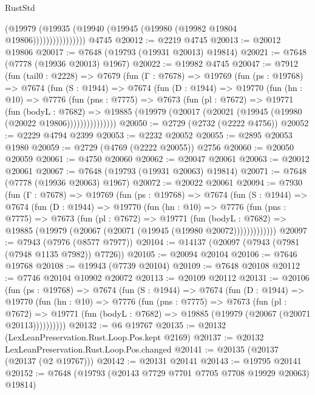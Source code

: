 \begin{lexlean}{RustStd}
\begin{coremodule}
{\begin{coremodule}
{{{{{{{{{{{{{{{{{{{{{{{{{{{{{{{{{{{{{{{{{{{{{{{{{{{{{                        (@19979
                          (@19935 (@19940 (@19945 (@19980 (@19982 @19804 @19806))))))))))))))))
    @4745
@20012 := @2219 @4745
@20013 := @20012 @19806
@20017 := @7648 (@19793 (@19931 @20013) @19814)
@20021 := @7648 (@7778 (@19936 @20013) @1967)
@20022 := @19982 @4745
@20047 := @7912
    (fun (tail0 : @2228) =>
    @7679
      (fun (Γ : @7678) =>
      @19769
        (fun (ps : @19768) =>
        @7674
          (fun (S : @1944) =>
          @7674
            (fun (D : @1944) =>
            @19770
              (fun (hn : @10) =>
              @7776
                (fun (pns : @7775) =>
                @7673
                  (fun (pl : @7672) =>
                  @19771
                    (fun (bodyL : @7682) =>
                    @19885 (@19979 (@20017 (@20021 (@19945 (@19980 (@20022 @19806)))))))))))))))
@20050 := @2729 (@2732 (@2222 @4756))
@20052 := @2229 @4794 @2399
@20053 := @2232 @20052
@20055 := @2895 @20053 @1980
@20059 := @2729 (@4769 (@2222 @20055)) @2756
@20060 := @20050 @20059
@20061 := @4750 @20060
@20062 := @20047 @20061
@20063 := @20012 @20061
@20067 := @7648 (@19793 (@19931 @20063) @19814)
@20071 := @7648 (@7778 (@19936 @20063) @1967)
@20072 := @20022 @20061
@20094 := @7930
    (fun (Γ : @7678) =>
    @19769
      (fun (ps : @19768) =>
      @7674
        (fun (S : @1944) =>
        @7674
          (fun (D : @1944) =>
          @19770
            (fun (hn : @10) =>
            @7776
              (fun (pns : @7775) =>
              @7673
                (fun (pl : @7672) =>
                @19771
                  (fun (bodyL : @7682) =>
                  @19885 (@19979 (@20067 (@20071 (@19945 (@19980 @20072)))))))))))))
@20097 := @7943 (@7976 (@8577 @7977))
@20104 := @14137 (@20097 (@7943 (@7981 (@7948 @1135 @7982)) @7726))
@20105 := @20094 @20104
@20106 := @7646 @19768
@20108 := @19943 (@7739 @20104)
@20109 := @7648 @20108
@20112 := @7746 @20104 @10902 @20072
@20113 := @20109 @20112
@20131 := @20106
    (fun (ps : @19768) =>
    @7674
      (fun (S : @1944) =>
      @7674
        (fun (D : @1944) =>
        @19770
          (fun (hn : @10) =>
          @7776
            (fun (pns : @7775) =>
            @7673
              (fun (pl : @7672) =>
              @19771 (fun (bodyL : @7682) => @19885 (@19979 (@20067 (@20071 @20113))))))))))
@20132 := @6 @19767
@20135 := @20132 (LexLeanPreservation.Rust.Loop.Pos.kept @2169)
@20137 := @20132 LexLeanPreservation.Rust.Loop.Pos.changed
@20141 := @20135 (@20137 (@20137 (@2 @19767)))
@20142 := @20131 @20141
@20143 := @19795 @20141
@20152 := @7648 (@19793 (@20143 @7729 @7701 @7705 @7708 @19929 @20063) @19814)
}}}}}}}}}}}}}}}}}}}}}}}}}}}}}}}}}}}}}}}}}}}}}}}}}}}}}
\end{coremodule}}
\end{coremodule}
\end{lexlean}

